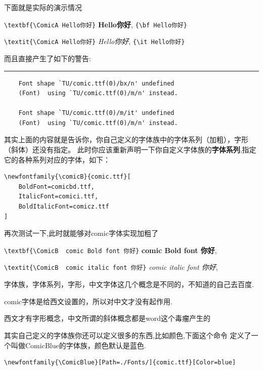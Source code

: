 \documentclass[12pt]{article}
\begin{document}
 下面就是实际的演示情况

\verb|\textbf{\ComicA Hello你好}| \faLongArrowAltRight \;\textbf{\ComicA Hello你好},
\;\verb|{\bf Hello你好}| \faLongArrowAltRight {}

\verb|\textit{\ComicA Hello你好}| \faLongArrowAltRight \;\textit{\ComicA Hello你好},
\;\verb|{\it Hello你好}| \faLongArrowAltRight {}

而且直接产生了如下的警告:

\noindent\rule{.9\linewidth}{2pt}
\begin{verbatim}
    Font shape `TU/comic.ttf(0)/bx/n' undefined
    (Font)	using `TU/comic.ttf(0)/m/n' instead. 

    Font shape `TU/comic.ttf(0)/m/it' undefined
    (Font)	using `TU/comic.ttf(0)/m/n' instead.
\end{verbatim}

其实上面的内容就是告诉你，你自己定义的字体族中的字体系列（加粗），字形（斜体）还没有指定。
此时你应该重新声明一下你自定义字体族的{\bf 字体系列},指定它的各种系列对应的字体，如下：
\clearpage
\begin{lstlisting}
\newfontfamily{\comicB}{comic.ttf}[
    BoldFont=comicbd.ttf,
    ItalicFont=comici.ttf,
    BoldItalicFont=comicz.ttf
]
\end{lstlisting}

再次测试一下,此时就能够对comic字体实现加粗了

\verb|\textbf{\ComicB  comic Bold font 你好}| \faLongArrowAltRight \;\textbf{\ComicB  comic Bold font 你好},

\verb|\textit{\ComicB  comic italic font 你好}| \faLongArrowAltRight \;\textit{\ComicB comic italic font 你好},

\begin{warning}
\; 字体族，字体系列，字形，中文字体这几个概念是不同的，不知道的自己去百度.

\; comic字体是给西文设置的，所以对中文才没有起作用.

\; 西文才有字形概念，中文所谓的斜体概念都是word这个毒瘤产生的
\end{warning}


其实自己定义的字体族你还可以定义很多的东西,比如颜色,下面这个命令
定义了一个叫做ComicBlue的字体族，颜色默认是蓝色.
\begin{lstlisting}
\newfontfamily{\ComicBlue}[Path=./Fonts/]{comic.ttf}[Color=blue]
\end{lstlisting}
\end{document}
